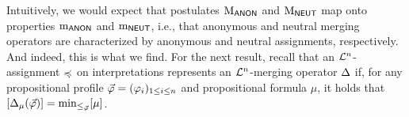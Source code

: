 
Intuitively, we would expect that postulates $\ppm{\ANON}$ and $\ppm{\NEUT}$ map onto 
properties $\oom{\ANON}$ and $\oom{\NEUT}$, 
i.e., that anonymous and neutral merging operators 
are characterized by anonymous and neutral assignments, respectively.
And indeed, this is what we find.
For the next result, recall that an $\L^n$-assignment $\as$ on interpretations
represents an $\L^{n}$-merging operator $\me$ if, for any 
propositional profile $\P=(\phi_i)_{1\le i \le n}$ and 
propositional formula $\mu$, it holds that $[\me_{\mu}(\P)]=\min_{\le_{\P}}[\mu]$.


